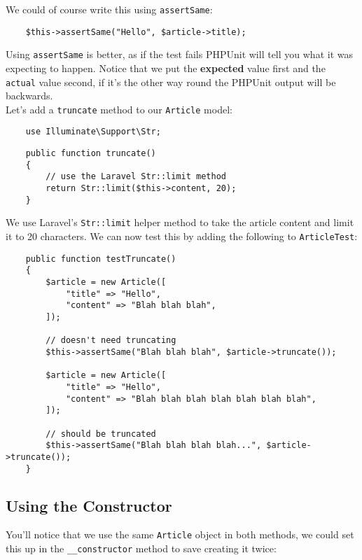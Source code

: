 We could of course write this using \texttt{assertSame}:

\begin{verbatim}
    $this->assertSame("Hello", $article->title);
\end{verbatim}

Using \texttt{assertSame} is better, as if the test fails PHPUnit will tell you what it was expecting to happen. Notice that we put the \textbf{expected} value first and the \texttt{actual} value second, if it's the other way round the PHPUnit output will be backwards.
\\

Let's add a \texttt{truncate} method to our \texttt{Article} model:

\begin{verbatim}
    use Illuminate\Support\Str;
\end{verbatim}

\begin{verbatim}
    public function truncate()
    {
        // use the Laravel Str::limit method
        return Str::limit($this->content, 20);
    }
\end{verbatim}

We use Laravel's \texttt{Str::limit} helper method to take the article content and limit it to 20 characters. We can now test this by adding the following to \texttt{ArticleTest}:

\begin{verbatim}
    public function testTruncate()
    {
        $article = new Article([
            "title" => "Hello",
            "content" => "Blah blah blah",
        ]);

        // doesn't need truncating
        $this->assertSame("Blah blah blah", $article->truncate());

        $article = new Article([
            "title" => "Hello",
            "content" => "Blah blah blah blah blah blah blah",
        ]);

        // should be truncated
        $this->assertSame("Blah blah blah blah...", $article->truncate());
    }
\end{verbatim}


\subsection{Using the Constructor}

You'll notice that we use the same \texttt{Article} object in both methods, we could set this up in the \texttt{\_\_constructor} method to save creating it twice:

